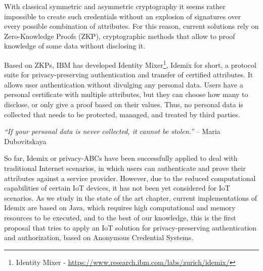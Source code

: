With classical symmetric and asymmetric cryptography it seems rather impossible to create such credentials without an explosion of signatures over every possible combination of attributes. For this reason, current solutions rely on  Zero-Knowledge Proofs (ZKP), cryptographic methods that allow to proof knowledge of some data without disclosing it.

Based on ZKPs, IBM has developed Identity Mixer\footnote{Identity Mixer - \url{https://www.research.ibm.com/labs/zurich/idemix/}}, Idemix for short, a protocol suite for privacy-preserving authentication and transfer of certified attributes. It allows user authentication without divulging any personal data. Users have a personal certificate with multiple attributes, but they can choose how many to disclose, or only give a proof based on their values. Thus, no personal data is collected that needs to be protected, managed, and treated by third parties.

\begin{center}
	\textit{``If your personal data is never collected, it cannot be stolen.''} -- Maria Dubovitskaya
\end{center}

So far, Idemix or privacy-ABCs have been successfully applied to deal with traditional Internet scenarios, in which users can authenticate and prove their attributes against a service provider. However, due to the reduced computational capabilities of certain IoT devices, it has not been yet considered for IoT scenarios. As we study in the state of the art chapter, current implementations of Idemix are based on Java, which requires high computational and memory resources to be executed, and to the best of our knowledge, this is the first proposal that tries to apply an IoT solution for privacy-preserving authentication and authorization, based on Anonymous Credential Systems.






